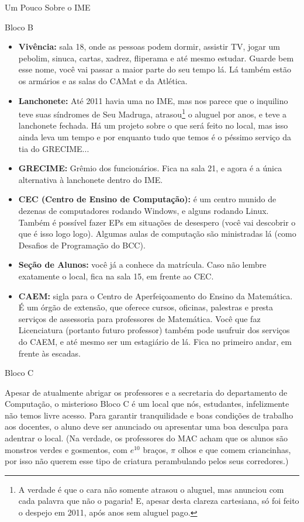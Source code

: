 \begin{secao}{Um Pouco Sobre o IME}
\begin{subsecao}{Bloco B}
\begin{itemize}
\item {\bf Vivência:} sala 18, onde as pessoas podem dormir, assistir TV, jogar
um pebolim, sinuca, cartas, xadrez, fliperama e até mesmo estudar. Guarde bem
esse nome, você vai passar a maior parte do seu tempo lá. Lá também estão os
armários e as salas do CAMat e da Atlética. 

\item {\bf Lanchonete:} Até 2011 havia uma no IME, mas nos parece que o inquilino
teve suas síndromes de Seu Madruga, atrasou\footnote{A verdade é que o cara não
somente atrasou o aluguel, mas anunciou com cada palavra que não o pagaria! E,
apesar desta clareza cartesiana, só foi feito o despejo em 2011, após anos sem
aluguel pago.} o aluguel por anos, e teve a lanchonete fechada. Há um projeto
sobre o que será feito no local, mas isso ainda leva um tempo e por enquanto
tudo que temos é o péssimo serviço da tia do GRECIME... 

\item {\bf GRECIME:} Grêmio dos funcionários. Fica na sala 21, e agora é a única
alternativa à lanchonete dentro do IME.

\item {\bf CEC (Centro de Ensino de Computação):} é um centro munido de dezenas
de computadores rodando Windows, e alguns rodando Linux. Também é possível fazer
EPs em situações de desespero (você vai descobrir o que é isso logo logo). Algumas
aulas de computação são ministradas lá (como Desafios de Programação do BCC).
 
\item {\bf Seção de Alunos:} você já a conhece da matrícula. Caso não lembre
exatamente o local, fica na sala 15, em frente ao CEC.

\item {\bf CAEM:} sigla para o Centro de Aperfeiçoamento do Ensino da Matemática.
É um órgão de extensão, que oferece cursos, oficinas, palestras e presta serviços
de assessoria para professores de Matemática. Você que faz Licenciatura (portanto
futuro professor) também pode usufruir dos serviços do CAEM, e até mesmo ser um
estagiário de lá. Fica no primeiro andar, em frente às escadas.

\end{itemize}
\end{subsecao}

\begin{subsecao}{Bloco C}

Apesar de atualmente abrigar os professores e a secretaria do departamento de
Computação, o misterioso Bloco C é um local que nós, estudantes, infelizmente não
temos livre acesso. Para garantir tranquilidade e boas condições de trabalho aos
docentes, o aluno deve ser anunciado ou apresentar uma boa desculpa para adentrar
o local. (Na verdade, os professores do MAC acham que os alunos são monstros
verdes e gosmentos, com $e^{10}$ braços, $\pi$ olhos e que comem criancinhas,
por isso não querem esse tipo de criatura perambulando pelos seus corredores.)


\end{subsecao}
\end{secao}
